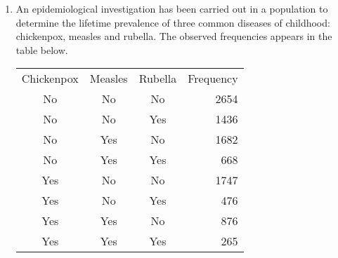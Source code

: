 \begin{enumerate}[leftmargin=*]

\item An epidemiological investigation has been carried out in a population to determine the lifetime prevalence of three common diseases of childhood: chickenpox, measles and rubella.
The observed frequencies appears in the table below. 
\begin{center} 
\begin{tabular}{cccr}
\toprule
Chickenpox & Measles & Rubella & Frequency\\
No & No & No & 2654\\
No & No & Yes & 1436\\
No & Yes & No & 1682\\
No & Yes & Yes & 668\\
Yes & No & No & 1747\\
Yes & No & Yes & 476\\
Yes & Yes & No & 876\\
Yes & Yes & Yes & 265\\
\bottomrule
\end{tabular}
\end{center}


\end{enumerate}
